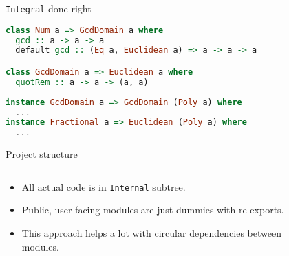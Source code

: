 \documentclass[handout]{beamer}
\begin{document}
\begin{frame}[fragile]{{\tt Integral} done right}

\begin{lstlisting}[language=Haskell]
class Num a => GcdDomain a where
  gcd :: a -> a -> a
  default gcd :: (Eq a, Euclidean a) => a -> a -> a

class GcdDomain a => Euclidean a where
  quotRem :: a -> a -> (a, a)
\end{lstlisting}

\pause

\begin{lstlisting}[language=Haskell]
instance GcdDomain a => GcdDomain (Poly a) where
  ...
instance Fractional a => Euclidean (Poly a) where
  ...
\end{lstlisting}

\end{frame}

\begin{frame}[fragile]{Project structure}

\begin{columns}[onlytextwidth,T]
  \begin{column}{.4\linewidth}
  \vspace{4em}

  \begin{itemize}
  \item All actual code is in {\tt Internal} subtree.
  \item Public, user-facing modules
        are just dummies with re-exports.
  \item This approach helps a lot with circular dependencies
        between modules.
  \end{itemize}
  \end{column}
  \begin{column}{.1\linewidth}
  ~
  \end{column}
  \begin{column}{.5\linewidth}

\vspace{-1.3em}


\end{column}
\end{columns}

\end{frame}
\end{document}
